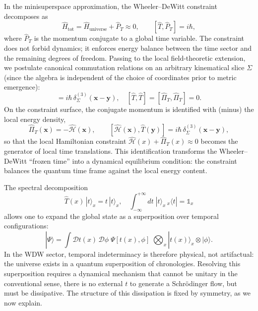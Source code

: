 \documentclass[12pt,a4paper]{article}
\numberwithin{equation}{section}
\begin{document}
\noindent In the minisuperspace approximation, the Wheeler--DeWitt constraint
decomposes as
\begin{equation}
\hat{H}_{\text{tot}}=\hat{H}_{\text{universe}}+\hat{P}_T \approx 0, \qquad
[\hat{T},\hat{P}_T]=i\hbar,
\label{eq:minisspace-split}
\end{equation}
where $\hat{P}_T$ is the momentum conjugate to a global time variable. The
constraint does not forbid dynamics; it enforces energy balance between the
time sector and the remaining degrees of freedom. Passing to the local
field-theoretic extension, we postulate canonical commutation relations on an arbitrary
kinematical slice $\Sigma$ (since the algebra is independent of the choice of coordinates prior to metric emergence):
\begin{equation}
[\hat{T}(\mathbf{x}),\hat{\Pi}_T(\mathbf{y})]
= i\hbar\,\delta^{(3)}_{\Sigma}(\mathbf{x}-\mathbf{y}),\quad
[\hat{T},\hat{T}]=[\hat{\Pi}_T,\hat{\Pi}_T]=0.
\label{eq:canonical-commutators}
\end{equation}
On the constraint surface, the conjugate momentum is identified with (minus) the local energy density,
\begin{equation}
\hat{\Pi}_T(\mathbf{x})=-\hat{\mathcal{H}}(\mathbf{x}),\qquad
[\hat{\mathcal{H}}(\mathbf{x}),\hat{T}(\mathbf{y})]
= i\hbar\,\delta^{(3)}_{\Sigma}(\mathbf{x}-\mathbf{y}),
\label{eq:conjugacy}
\end{equation}
so that the local Hamiltonian constraint
$\hat{\mathcal{H}}(x)+\hat{\Pi}_T(x)\approx 0$ becomes the generator of
local time translations. This identification transforms the Wheeler--DeWitt
``frozen time'' into a dynamical equilibrium condition: the constraint
balances the quantum time frame against the local energy content.

\noindent The spectral decomposition
\begin{equation}
\hat{T}(x)\,|t\rangle_x = t\,|t\rangle_x, \quad
\int_{-\infty}^{+\infty}\!dt\; |t\rangle_x\,{}_x\langle t| = \mathbb{1}_x
\label{eq:decomposition}
\end{equation}
allows one to expand the global state as a superposition over temporal
configurations:
\begin{equation}
|\Psi\rangle = \!\int\!\mathcal{D}t(x)\,\mathcal{D}\phi\;
\Psi[t(x),\phi]\;\bigotimes_x |t(x)\rangle_x\!\otimes|\phi\rangle.
\label{eq:expansion}
\end{equation}
In the WDW sector, temporal indeterminacy is therefore physical, not
artifactual: the universe exists in a quantum superposition of chronologies.
Resolving this superposition requires a dynamical mechanism that cannot be
unitary in the conventional sense, there is no external $t$ to generate a
Schr\"odinger flow, but must be dissipative. The structure of this
dissipation is fixed by symmetry, as we now explain.
\end{document}
